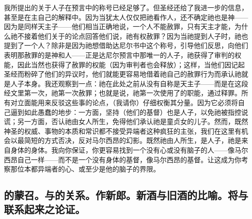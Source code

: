 我所提出的关于人子在预言中的称号已经足够了。但圣经还给了我进一步的信息，甚至是在主自己的解释中。因为当犹太人仅仅把祂看作人，还不确定祂也是神——因为是同样天主子——他们相当正确地说，一个人不能赦罪，只有天主才能，为什么祂不接着他们关于的论点回答他们说，祂有权赦罪？因为当祂提到人子时，祂也提到了一个人？除非是因为祂想借助达尼尔书中这个称号，引导他们反思，向他们表明那赦罪的是神和人——正是达尼尔预言中那唯一的人子，祂获得了审判的权能，因此当然也获得了赦罪的权能（因为审判者也会释放）；这样，当他们因记起圣经而粉碎了他们的异议时，他们就能更容易地借着祂自己的赦罪行为而承认祂就是人子本身。我还观察到一点：祂在此处之前从没有自称是天主子——而是在这段经文里第一次，祂第一次赦罪；也就是说，祂第一次使用了的职能，通过释罪。所有对立面能用来反驳这些事的论点，（我请你）仔细权衡其分量。因为它必须将自己逼到如此愚蠢的地步：一方面，坚持（他们的基督）也是人子，以免祂被指控说谎；另一方面，否认祂由女人所生，免得他们承认祂是童贞女的儿子。然而，既然神圣的权威、事物的本质和常识都不接受异端者这种疯狂的主张，我们在这里有机会以最简短的方式否决，反对马尔西昂的幻影。既然祂由人所生，是人子，祂是来自身体的身体。我向你保证，你更容易找到一个没有心或没有脑子的人——像马尔西昂自己一样——而不是一个没有身体的基督，像马尔西昂的基督。让这成为你考察那位本都异端者的心、或至少是他的脑子的界限。\par


\subsection{的蒙召。与的关系。作新郎。新酒与旧酒的比喻。将与联系起来之论证。}

